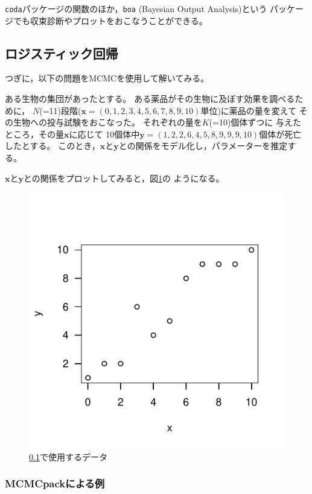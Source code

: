 \documentclass[11pt,uplatex]{jsarticle}
\begin{document}
\texttt{coda}パッケージの関数のほか，\texttt{boa} (Bayesian Output Analysis)という
パッケージでも収束診断やプロットをおこなうことができる。



\subsection{ロジスティック回帰}
\label{logistic}


つぎに，以下の問題をMCMCを使用して解いてみる。
\vspace{1zw}

\hspace{18mm}
\begin{minipage}{100mm}
\begin{breakbox}
\noindent
ある生物の集団があったとする。
ある薬品がその生物に及ぼす効果を調べるために，
$N$(=11)段階($\bm{x} = (0, 1, 2, 3, 4, 5, 6, 7, 8, 9, 10)$単位)に薬品の量を変えて
その生物への投与試験をおこなった。
それぞれの量を$K$(=10)個体ずつに
与えたところ，その量$\bm{x}$に応じて
10個体中$\bm{y} = (1, 2, 2, 6, 4, 5, 8, 9, 9, 9, 10)$個体が死亡したとする。
このとき，$\bm{x}$と$\bm{y}$との関係をモデル化し，パラメーターを推定する。
\end{breakbox}
\end{minipage}
\vspace{1zw}

$\bm{x}$と$\bm{y}$との関係をプロットしてみると，図\ref{example2_plot}の
ようになる。

\begin{figure}[htbp]
  \begin{center}
    \includegraphics[bb=0 0 240 240, clip, width=160 bp]{example2.pdf}
  \end{center}
  \caption{\ref{logistic}で使用するデータ}
  \label{example2_plot}
\end{figure}


\subsubsection{MCMCpackによる例}
\end{document}
